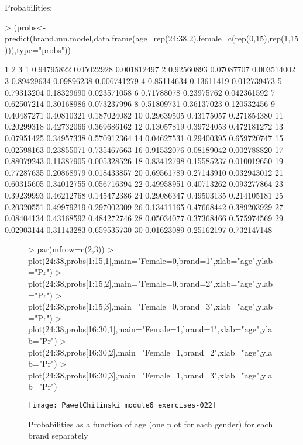 \documentclass[a4paper]{article}
\begin{document}
\begin{itemize}
Probabilities:
\begin{Schunk}
\begin{Sinput}
> (probs<-predict(brand.mn.model,data.frame(age=rep(24:38,2),female=c(rep(0,15),rep(1,15))),type="probs"))	
\end{Sinput}
\begin{Soutput}
            1          2           3
1  0.94795822 0.05022928 0.001812497
2  0.92560893 0.07087707 0.003514002
3  0.89429634 0.09896238 0.006741279
4  0.85114634 0.13611419 0.012739473
5  0.79313204 0.18329690 0.023571058
6  0.71788078 0.23975762 0.042361592
7  0.62507214 0.30168986 0.073237996
8  0.51809731 0.36137023 0.120532456
9  0.40487271 0.40810321 0.187024082
10 0.29639505 0.43175057 0.271854380
11 0.20299318 0.42732066 0.369686162
12 0.13057819 0.39724053 0.472181272
13 0.07951425 0.34957338 0.570912364
14 0.04627531 0.29400395 0.659720747
15 0.02598163 0.23855071 0.735467663
16 0.91532076 0.08189042 0.002788820
17 0.88079243 0.11387905 0.005328526
18 0.83412798 0.15585237 0.010019650
19 0.77287635 0.20868979 0.018433857
20 0.69561789 0.27143910 0.032943012
21 0.60315605 0.34012755 0.056716394
22 0.49958951 0.40713262 0.093277864
23 0.39239993 0.46212768 0.145472386
24 0.29086347 0.49503135 0.214105181
25 0.20320551 0.49979219 0.297002309
26 0.13411165 0.47668442 0.389203929
27 0.08404134 0.43168592 0.484272746
28 0.05034077 0.37368466 0.575974569
29 0.02903144 0.31143283 0.659535730
30 0.01623089 0.25162197 0.732147148
\end{Soutput}
\end{Schunk}
\begin{figure}[H]
\begin{center}
\begin{Schunk}
\begin{Sinput}
> par(mfrow=c(2,3))
> plot(24:38,probs[1:15,1],main="Female=0,brand=1",xlab="age",ylab="Pr")
> plot(24:38,probs[1:15,2],main="Female=0,brand=2",xlab="age",ylab="Pr")
> plot(24:38,probs[1:15,3],main="Female=0,brand=3",xlab="age",ylab="Pr")
> plot(24:38,probs[16:30,1],main="Female=1,brand=1",xlab="age",ylab="Pr")
> plot(24:38,probs[16:30,2],main="Female=1,brand=2",xlab="age",ylab="Pr")
> plot(24:38,probs[16:30,3],main="Female=1,brand=3",xlab="age",ylab="Pr")
\end{Sinput}
\end{Schunk}
\texttt{[image: PawelChilinski\_module6\_exercises-022]}
\caption{Probabilities as a function of age (one plot for each gender) for each
brand separately}
\end{center}
\end{figure}
\end{itemize}
\end{document}
